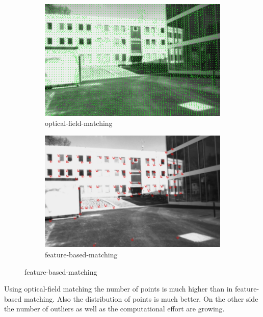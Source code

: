 \documentclass[11pt]{article}
\begin{document}
	\begin{figure}[H]
	        \centering
	        \begin{subfigure}[b]{0.45\textwidth}
	                \includegraphics[width=1.0\textwidth]{images/farneback.jpg}
	                \caption{optical-field-matching}
	        \end{subfigure}\hfill 
	        \begin{subfigure}[b]{0.45\textwidth}
	                \includegraphics[width=1.0\textwidth]{images/feature-based-matching.jpg}
	                \caption{feature-based-matching}
	        \end{subfigure}
	\end{figure}
	
	Using optical-field matching the number of points is much higher than in feature-based matching. Also the distribution of points is much better. On the other side the number of outliers as well as the computational effort are growing.
\end{document}
